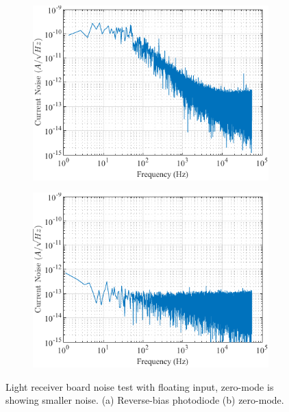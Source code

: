 \begin{figure}[h]
\centering
\begin{subfigure}{.5\textwidth}
  \centering
  \includegraphics[width=1\linewidth]{4-ANC_Sys/NoiseReverseBias.pdf}
  \caption{}
  \label{fig_NoiseReverseBias}
\end{subfigure}%
\begin{subfigure}{.5\textwidth}
  \centering
  \includegraphics[width=1\linewidth]{4-ANC_Sys/NoiseZeroMode.pdf}
  \caption{}
  \label{fig_NoiseZeroMode}
\end{subfigure}
\caption{Light receiver board noise test with floating input, zero-mode is showing smaller noise. (a) Reverse-bias photodiode (b) zero-mode.}
\label{fig_RecBoardNoiseTest}
\end{figure}

